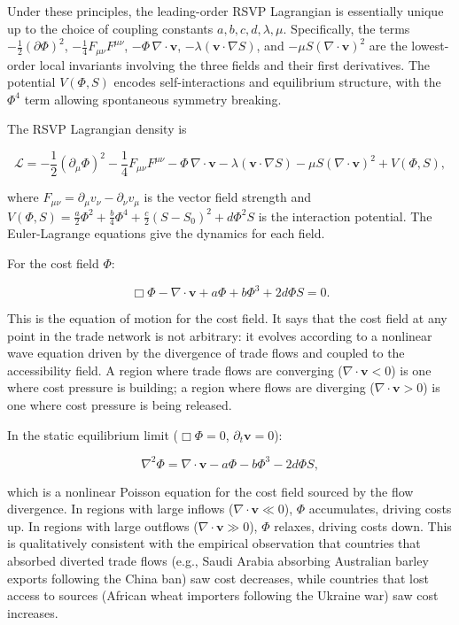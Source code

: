 \documentclass[12pt]{article}
\newcommand{\Lag}{\mathcal{L}}
\newcommand{\divv}{\nabla\!\cdot\!\mathbf{v}}
\begin{document}
Under these principles, the leading-order RSVP Lagrangian is essentially unique up to the choice of coupling constants $a, b, c, d, \lambda, \mu$. Specifically, the terms $-\frac{1}{2}(\partial\Phi)^2$, $-\frac{1}{4}F_{\mu\nu}F^{\mu\nu}$, $-\Phi\,\divv$, $-\lambda(\mathbf{v}\cdot\nabla S)$, and $-\mu S(\divv)^2$ are the lowest-order local invariants involving the three fields and their first derivatives. The potential $V(\Phi, S)$ encodes self-interactions and equilibrium structure, with the $\Phi^4$ term allowing spontaneous symmetry breaking.

The RSVP Lagrangian density is

\begin{equation}
\Lag = -\frac{1}{2}(\partial_\mu \Phi)^2 - \frac{1}{4}F_{\mu\nu}F^{\mu\nu} - \Phi\,\divv - \lambda(\mathbf{v}\cdot\nabla S) - \mu S(\divv)^2 + V(\Phi, S),
\label{eq:rsvp_lagrangian}
\end{equation}

where $F_{\mu\nu} = \partial_\mu v_\nu - \partial_\nu v_\mu$ is the vector field strength and $V(\Phi, S) = \frac{a}{2}\Phi^2 + \frac{b}{4}\Phi^4 + \frac{c}{2}(S-S_0)^2 + d\Phi^2 S$ is the interaction potential. The Euler-Lagrange equations give the dynamics for each field.

For the cost field $\Phi$:

\begin{equation}
\Box\Phi - \divv + a\Phi + b\Phi^3 + 2d\Phi S = 0.
\label{eq:phi_dynamics}
\end{equation}

This is the equation of motion for the cost field. It says that the cost field at any point in the trade network is not arbitrary: it evolves according to a nonlinear wave equation driven by the divergence of trade flows and coupled to the accessibility field. A region where trade flows are converging ($\divv < 0$) is one where cost pressure is building; a region where flows are diverging ($\divv > 0$) is one where cost pressure is being released.

In the static equilibrium limit ($\Box\Phi = 0$, $\partial_t \mathbf{v} = 0$):

\begin{equation}
\nabla^2\Phi = \divv - a\Phi - b\Phi^3 - 2d\Phi S,
\label{eq:phi_static}
\end{equation}

which is a nonlinear Poisson equation for the cost field sourced by the flow divergence. In regions with large inflows ($\divv \ll 0$), $\Phi$ accumulates, driving costs up. In regions with large outflows ($\divv \gg 0$), $\Phi$ relaxes, driving costs down. This is qualitatively consistent with the empirical observation that countries that absorbed diverted trade flows (e.g., Saudi Arabia absorbing Australian barley exports following the China ban) saw cost decreases, while countries that lost access to sources (African wheat importers following the Ukraine war) saw cost increases.
\end{document}
